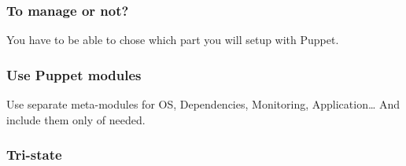 \begin{frame}
    \frametitle{To manage or not?}
    \huge You have to be able to chose which part you will setup with Puppet.
\end{frame}
\begin{frame}
    \frametitle{Use Puppet modules}
    \huge Use separate meta-modules for OS, Dependencies, Monitoring, Application\dots{} And include them only of needed.
\end{frame}

\begin{frame}
    \frametitle{Tri-state}


\end{frame}






















\thankyouSlide
\renewcommand{\insertLogo}{}
\contactSlide
